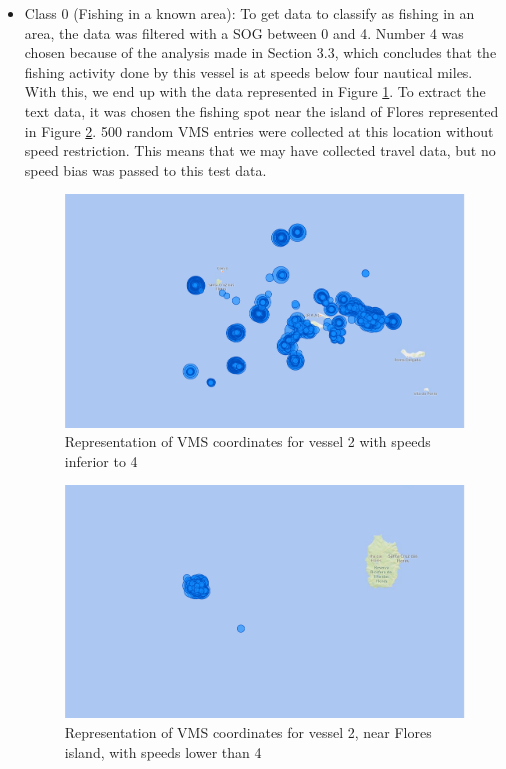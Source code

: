 \begin{itemize}
\item Class 0 (Fishing in a known area): To get data to classify as fishing in an area, the data was filtered with a SOG between 0 and 4. Number 4 was chosen because of the analysis made in Section 3.3, which concludes that the fishing activity done by this vessel is at speeds below four nautical miles. With this, we end up with the data represented in Figure \ref{fig:bi_2_all}. To extract the text data, it was chosen the fishing spot near the island of Flores represented in Figure \ref{fig:bi_2_flores}. 500 random VMS entries were collected at this location without speed restriction. This means that we may have collected travel data, but no speed bias was passed to this test data. 


\begin{figure}[]
\centering
\includegraphics[width=0.8\linewidth]{Chapters/img/2fishingAll.pdf}
\caption{Representation of VMS coordinates for vessel 2 with speeds inferior to 4 }
\label{fig:bi_2_all}
\end{figure}

\begin{figure}[]
\centering
\includegraphics[width=0.8\linewidth]{Chapters/img/2fishing.pdf}
\caption{Representation of VMS coordinates for vessel 2, near Flores island, with speeds lower than 4 }
\label{fig:bi_2_flores}
\end{figure}


\end{itemize}
